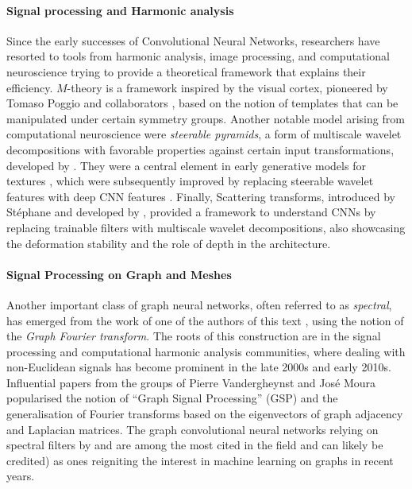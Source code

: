 \paragraph{Signal processing and Harmonic analysis}
Since the early successes of Convolutional Neural Networks, researchers have resorted to tools from harmonic analysis, image processing, and computational neuroscience trying to provide a theoretical framework that explains their efficiency. 
$M$-theory is a framework inspired by the visual cortex, pioneered by Tomaso Poggio and collaborators \citep{riesenhuber1999hierarchical, serre2007feedforward}, based on the notion of templates that can be manipulated under certain symmetry groups. Another notable model arising from computational neuroscience were {\em steerable pyramids}, a form of multiscale wavelet decompositions  with favorable properties against certain input transformations, developed by \cite{simoncelli1995steerable}. They were a central element in early generative models for textures \citep{portilla2000parametric}, which were subsequently improved by replacing steerable wavelet features with deep CNN features \cite{gatys2015texture}. 
Finally, Scattering transforms, introduced by St{\'e}phane \cite{mallat2012group} and developed by \cite{bruna2013invariant}, provided a framework to understand CNNs by replacing trainable filters with multiscale wavelet decompositions, also showcasing the deformation stability and the role of depth in the architecture.  








\paragraph{Signal Processing on Graph and Meshes}
Another important class of graph neural networks, often referred to as {\em spectral}, has emerged from the work of one of the authors of this text \citep{bruna2013spectral}, using the notion of the \emph{Graph Fourier transform}.  
%
The roots of this construction are in the signal processing and computational harmonic analysis communities, where dealing with non-Euclidean signals has become prominent in the late 2000s and early 2010s. Influential papers from the groups of Pierre Vandergheynst \citep{shuman2013emerging} and Jos{\'e} Moura \citep{sandryhaila2013discrete} popularised the notion of ``Graph Signal Processing'' (GSP) and the generalisation of Fourier transforms based on the eigenvectors of graph adjacency and Laplacian matrices. 
%
The graph convolutional neural networks relying on spectral filters by  \citet{defferrard2016convolutional} and \cite{kipf2016semi} are among the most cited in the field and can likely be credited) as ones  reigniting the interest in machine learning on graphs in recent years.  


